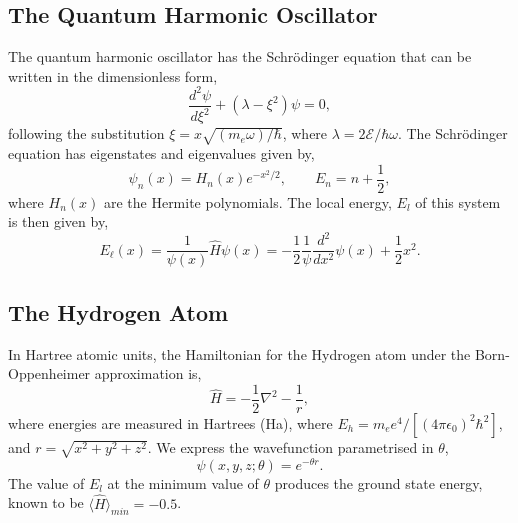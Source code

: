 \documentclass[journal,12pt]{Imperial_lab_report}
\begin{document}
    \subsection{The Quantum Harmonic Oscillator}
        The quantum harmonic oscillator has the Schrödinger equation that can be written in the dimensionless form,
        \begin{equation*}
            \frac{d^2\psi}{d\xi^2} + (\lambda - \xi^2)\psi = 0,
        \end{equation*}
        \noindent following the substitution $\xi = x\sqrt{(m_e \omega)/ \hbar}$, where $\lambda = {2\mathcal{E}}/{\hbar \omega}$. The Schrödinger equation has eigenstates and eigenvalues given by,
        \begin{equation} \label{QHO eigenstates}
            \psi_n(x) = H_n(x)e^{-x^{2}/2}, 
            \qquad
            E_n = n + \frac{1}{2},
        \end{equation} 
        \noindent where $H_n(x)$ are the Hermite polynomials. The local energy, $E_l$ of this system is then given by, 
        \begin{equation*}
            E_{\ell}(x) = \frac{1}{\psi(x)} \hat{H}\psi(x)
            = -\frac{1}{2}\frac{1}{\psi}\frac{d^{2}}{dx^{2}}\psi(x) + \frac{1}{2}x^{2}.
        \end{equation*}

    \subsection{The Hydrogen Atom}
        In Hartree atomic units, the Hamiltonian for the Hydrogen atom under the Born-Oppenheimer approximation is,
        \begin{equation} \label{hydrogen atom hamiltonian}
            \hat{H} = -\frac{1}{2} \nabla^2 - \frac{1}{r},
        \end{equation}
        \noindent where energies are measured in Hartrees (Ha), where $E_h=m_e e^4 / [(4\pi\epsilon_0)^2 \hbar^2]$, and $r=\sqrt{x^2 +y^2 + z^2}$. We express the wavefunction parametrised in $\theta$,
        \begin{equation*}
            \psi(x,y,z; \theta) = e^{-\theta r}.
        \end{equation*}
        The value of $E_l$ at the minimum value of $\theta$ produces the ground state energy, known to be ${\langle \hat{H} \rangle_{min}} = -0.5$.
\end{document}
